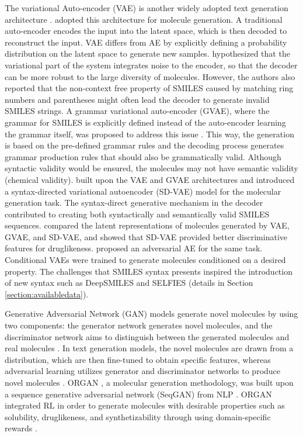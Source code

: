 \documentclass[review]{elsarticle}
\begin{document}
The variational Auto-encoder (VAE) is another widely adopted text generation architecture \cite{bowman2015generating}. \citet{gomez2018automatic} adopted this architecture for molecule generation. A traditional auto-encoder encodes the input into the latent space, which is then decoded to reconstruct the input. VAE differs from AE by explicitly defining a probability distribution on the latent space to generate new samples. \citet{gomez2018automatic}  hypothesized that the variational part of the system integrates noise to the encoder, so that the decoder can be more robust to the large diversity of molecules. However, the authors also reported that the non-context free property of SMILES caused by matching ring numbers and parentheses might often lead the decoder to generate invalid SMILES strings.  A grammar variational auto-encoder (GVAE), where the grammar for SMILES is explicitly defined instead of the auto-encoder learning the grammar itself, was proposed to address this issue \cite{kusner2017grammar}. This way, the generation is based on the pre-defined grammar rules and the decoding process generates grammar production rules that should also be grammatically valid. Although syntactic validity would be ensured, the molecules may not have semantic validity (chemical validity). \citet{dai2018syntax} built upon the VAE \cite{gomez2018automatic} and GVAE \cite{kusner2017grammar} architectures and introduced a syntax-directed variational autoencoder (SD-VAE) model for the molecular generation task. The syntax-direct generative mechanism in the decoder contributed to creating  both syntactically and semantically valid SMILES sequences. \citet{dai2018syntax} compared the latent representations of molecules generated by VAE, GVAE, and SD-VAE, and showed that SD-VAE provided better discriminative features for druglikeness. \citet{blaschke2018application} proposed an adversarial AE for the same task. Conditional VAEs \cite{lim2018molecular, kang2018conditional} were trained to generate molecules conditioned on a desired property. The  challenges that SMILES syntax presents inspired the introduction of new syntax such as DeepSMILES \cite{OBoyle2018} and SELFIES \cite{krenn2019selfies} (details in Section \ref{section:availabledata}). 

Generative Adversarial Network (GAN) models generate novel molecules by using two components: the generator network generates novel molecules, and the discriminator network aims to distinguish between the generated molecules and real molecules \cite{hong2019generative}. In text generation models, the novel molecules are drawn from a distribution, which are then fine-tuned to obtain specific features, whereas adversarial learning utilizes generator and discriminator networks to produce novel molecules \cite{hong2019generative, guimaraes2017objective}. ORGAN \cite{guimaraes2017objective}, a molecular generation methodology, was built upon a sequence generative adversarial network (SeqGAN) from NLP \cite{yu2017seqgan}. ORGAN integrated RL in order to generate molecules with desirable properties such as solubility, druglikeness, and synthetizability through using domain-specific rewards  \cite{guimaraes2017objective}.  
\end{document}
